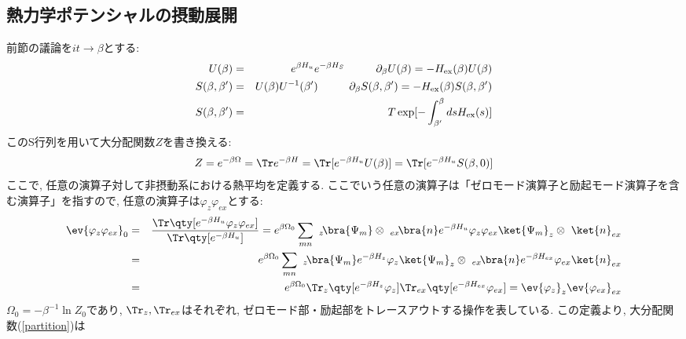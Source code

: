 \documentclass[10.5pt,a4paper]{jreport}
\begin{document}
\subsection{熱力学ポテンシャルの摂動展開}
前節の議論を$it \rightarrow \beta$とする:
\begin{eqnarray}
  U(\beta) &=& e^{\beta H_u}e^{-\beta H_S}\hspace{1cm}\partial_\beta U(\beta) = -H_{\rm ex}(\beta)U(\beta)\\
  S(\beta, \beta') &=& U(\beta)U^{-1}(\beta')\hspace{1cm}\partial_\beta S(\beta, \beta') = -H_{\rm ex}(\beta)S(\beta, \beta')\\
  S(\beta, \beta') &=& T\exp[-\int_{\beta'}^{\beta}ds H_{\rm ex}(s)]
\end{eqnarray}
このS行列を用いて大分配関数$Z$を書き換える:
\begin{eqnarray}
  Z = e^{-\beta\Omega} = \Tr e^{-\beta H} = \Tr[e^{-\beta H_u}U(\beta)]= \Tr[e^{-\beta H_u}S(\beta, 0)]\label{partition}
\end{eqnarray}
ここで, 任意の演算子対して非摂動系における熱平均を定義する. ここでいう任意の演算子は「ゼロモード演算子と励起モード演算子を含む演算子」を指すので, 任意の演算子は$\varphi_{z}\varphi_{ex}$とする:
\begin{eqnarray}
  \nonumber  \ev{\varphi_{z}\varphi_{ex}}_0 &=& \frac{\Tr\qty[e^{-\beta H_u}\varphi_{z}\varphi_{ex}]}{\Tr\qty[e^{-\beta H_u}]} = e^{\beta\Omega_0}\sum_{mn}\ _z\!\bra{\Psi_m}\otimes\ _{ex}\!\bra{n}e^{-\beta H_u}\varphi_z\varphi_{ex} \ket{\Psi_m}_z\otimes\ \ket{n}_{ex}\\
  \nonumber  &=& e^{\beta\Omega_0}\sum_{mn}\ _z\!\bra{\Psi_m}e^{-\beta H_z}\varphi_z\ket{\Psi_m}_z\otimes\ _{ex}\!\bra{n}e^{-\beta H_{ex}}\varphi_{ex}\ket{n}_{ex}\\
  &=& e^{\beta\Omega_0}\Tr_{z}\qty[e^{-\beta H_z}\varphi_z]\Tr_{ex}\qty[e^{-\beta H_{ex}}\varphi_{ex}] = \ev{\varphi_z}_z\ev{\varphi_{ex}}_{ex}
\end{eqnarray}
$\Omega_0 = -\beta^{-1}\ln Z_0$であり, $\Tr_z, \Tr_{ex}$はそれぞれ, ゼロモード部・励起部をトレースアウトする操作を表している. この定義より, 大分配関数(\ref{partition})は
\end{document}
